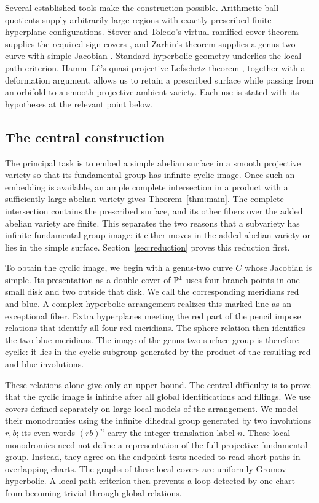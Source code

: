 Several established tools make the construction possible.  Arithmetic
ball quotients supply arbitrarily large regions with exactly prescribed
finite hyperplane configurations.  Stover and Toledo's virtual
ramified-cover theorem supplies the required sign covers
\cite{StoverToledo,LlosaPy}, and Zarhin's theorem supplies a
genus-two curve with simple Jacobian \cite{Zarhin}.  Standard
hyperbolic geometry \cite{BridsonHaefliger} underlies the local path
criterion.  Hamm--L\^e's quasi-projective Lefschetz theorem
\cite{HammLe}, together with a deformation argument, allows us to
retain a prescribed surface while passing
from an orbifold to a smooth projective ambient variety.  Each use is
stated with its hypotheses at the relevant point below.

\subsection{The central construction}
The principal task is to embed a simple abelian surface in a smooth
projective variety so that its fundamental group has infinite cyclic
image.  Once such an embedding is available, an ample complete
intersection in a product with a sufficiently large abelian variety
gives Theorem~\ref{thm:main}.  The complete intersection contains the
prescribed surface, and its other fibers over the added abelian variety
are finite.  This separates the two reasons that a subvariety has
infinite fundamental-group image: it either moves in the added abelian
variety or lies in the simple surface.  Section~\ref{sec:reduction}
proves this reduction first.

To obtain the cyclic image, we begin with a genus-two curve $C$ whose
Jacobian is simple.  Its presentation as a double cover of $\mathbb P^1$
uses four branch points in one small disk and two outside that disk.
We call the corresponding meridians red and blue.  A complex hyperbolic
arrangement realizes this marked line as an exceptional fiber.  Extra
hyperplanes meeting the red part of the pencil impose relations that
identify all four red meridians.  The sphere relation then identifies
the two blue meridians.  The image of the genus-two surface group is
therefore cyclic: it lies in the cyclic subgroup generated by the product
of the resulting red and blue involutions.

These relations alone give only an upper bound.  The central difficulty
is to prove that the cyclic image is infinite after all global
identifications and fillings.  We use covers defined separately on
large local models of the arrangement.  We model their monodromies
using the infinite dihedral group generated by two involutions $r,b$;
its even words $(rb)^n$ carry the integer translation label $n$.
These local monodromies need not
define a representation of the full projective fundamental group.
Instead, they agree on the endpoint tests needed to read short paths
in overlapping charts.  The graphs of these local covers are uniformly
Gromov hyperbolic.  A local path criterion then prevents a loop detected
by one chart from becoming trivial through global relations.

